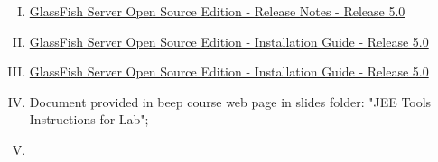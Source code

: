 \begin{enumerate}[(I)]
	\item \href{https://javaee.github.io/glassfish/doc/5.0/release-notes.pdf}{\color{blue}GlassFish Server Open Source Edition - Release Notes - Release 5.0}
	\item \href{https://javaee.github.io/glassfish/doc/5.0/installation-guide.pdf}{\color{blue}GlassFish Server Open Source Edition - Installation Guide - Release 5.0 }
	\item \href{https://javaee.github.io/glassfish/doc/5.0/installation-guide.pdf}{\color{blue}GlassFish Server Open Source Edition - Installation Guide - Release 5.0 }
	\item Document provided in beep course web page in slides folder: "JEE Tools Instructions for Lab";
	\item {}
\end{enumerate}